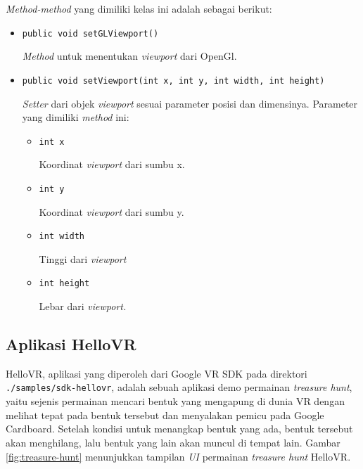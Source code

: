 \begin{enumerate}
		\textit{Method-method} yang dimiliki kelas ini adalah sebagai berikut:
		
		\begin{itemize}			
			\item \texttt{public void setGLViewport()}
			
			\textit{Method} untuk menentukan \textit{viewport} dari OpenGl.
			
			\item \texttt{public void setViewport(int x, int y, int width, int height)}
			
			\textit{Setter} dari objek \textit{viewport} sesuai parameter posisi dan dimensinya. Parameter yang dimiliki \textit{method} ini:
			
			\begin{itemize}
				\item \texttt{int x}
				
				Koordinat \textit{viewport} dari sumbu x.
				\item \texttt{int y}
				
				Koordinat \textit{viewport} dari sumbu y. 
				
				\item \texttt{int width}
				
				Tinggi dari \textit{viewport}
				\item \texttt{int height}
				
				Lebar dari \textit{viewport.}				
				
			\end{itemize}						
		\end{itemize}
	\end{enumerate}

\subsection{Aplikasi HelloVR}
\label{subs:hello-vr}
HelloVR, aplikasi yang diperoleh dari Google VR SDK pada direktori \texttt{./samples/sdk-hellovr}, adalah sebuah aplikasi demo permainan \textit{treasure hunt}, yaitu sejenis permainan mencari bentuk yang mengapung di dunia VR dengan melihat tepat pada bentuk tersebut dan menyalakan pemicu pada Google Cardboard. Setelah kondisi untuk menangkap bentuk yang ada, bentuk tersebut akan menghilang, lalu bentuk yang lain akan muncul di tempat lain. Gambar \ref{fig:treasure-hunt} menunjukkan tampilan \textit{UI} permainan \textit{treasure hunt} HelloVR. 

